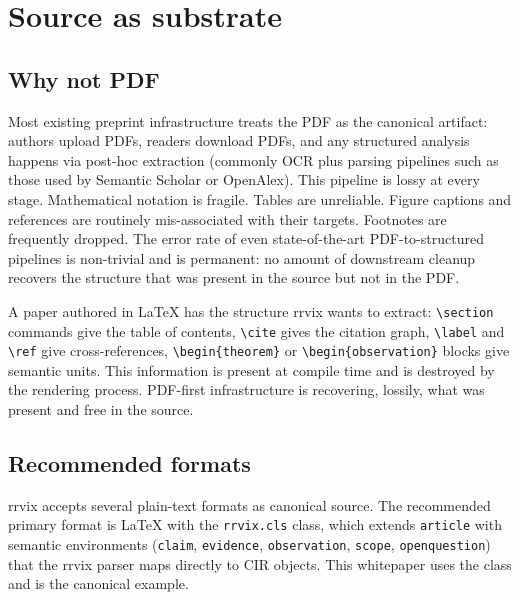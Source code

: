 \documentclass[11pt]{rrvix}
\begin{document}
\section{Source as substrate}
\label{sec:source}

\subsection{Why not PDF}

Most existing preprint infrastructure treats the PDF as the canonical artifact: authors upload PDFs, readers download PDFs, and any structured analysis happens via post-hoc extraction (commonly OCR plus parsing pipelines such as those used by Semantic Scholar or OpenAlex). This pipeline is lossy at every stage. Mathematical notation is fragile. Tables are unreliable. Figure captions and references are routinely mis-associated with their targets. Footnotes are frequently dropped. The error rate of even state-of-the-art PDF-to-structured pipelines is non-trivial and is permanent: no amount of downstream cleanup recovers the structure that was present in the source but not in the PDF.

\begin{evidence}
A paper authored in LaTeX has the structure rrvix wants to extract: \texttt{\textbackslash section} commands give the table of contents, \texttt{\textbackslash cite} gives the citation graph, \texttt{\textbackslash label} and \texttt{\textbackslash ref} give cross-references, \texttt{\textbackslash begin\{theorem\}} or \texttt{\textbackslash begin\{observation\}} blocks give semantic units. This information is present at compile time and is destroyed by the rendering process. PDF-first infrastructure is recovering, lossily, what was present and free in the source.
\end{evidence}

\subsection{Recommended formats}

rrvix accepts several plain-text formats as canonical source. The recommended primary format is LaTeX with the \texttt{rrvix.cls} class, which extends \texttt{article} with semantic environments (\texttt{claim}, \texttt{evidence}, \texttt{observation}, \texttt{scope}, \texttt{openquestion}) that the rrvix parser maps directly to CIR objects. This whitepaper uses the class and is the canonical example.
\end{document}
